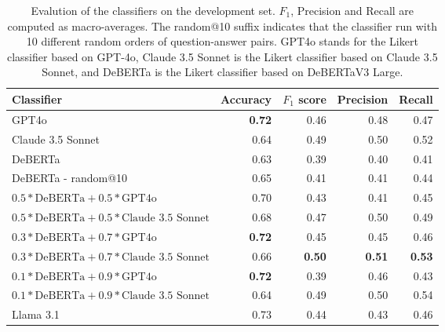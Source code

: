 \begin{table*}
    \centering
    \begin{tabular}{lrrrr}
        \toprule
        Classifier & Accuracy & $F_1$ score & Precision & Recall \\
        \midrule
        GPT4o & \textbf{0.72} & 0.46 & 0.48 & 0.47 \\
        Claude 3.5 Sonnet & 0.64 & 0.49 & 0.50 & 0.52 \\
        DeBERTa & 0.63 & 0.39 & 0.40 & 0.41 \\
        DeBERTa - random@10 & 0.65 & 0.41 & 0.41 & 0.44 \\
        $0.5*\mbox{DeBERTa}+0.5*\mbox{GPT4o}$ & 0.70 & 0.43 & 0.41 & 0.45 \\
        $0.5*\mbox{DeBERTa}+0.5*\mbox{Claude 3.5 Sonnet}$ & 0.68 & 0.47 & 0.50 & 0.49 \\
        $0.3*\mbox{DeBERTa}+0.7*\mbox{GPT4o}$ & \textbf{0.72} & 0.45 & 0.45 & 0.46 \\
        $0.3*\mbox{DeBERTa}+0.7*\mbox{Claude 3.5 Sonnet}$ & 0.66 & \textbf{0.50} & \textbf{0.51} & \textbf{0.53} \\
        $0.1*\mbox{DeBERTa}+0.9*\mbox{GPT4o}$ & \textbf{0.72} & 0.39 & 0.46 & 0.43 \\
        $0.1*\mbox{DeBERTa}+0.9*\mbox{Claude 3.5 Sonnet}$ & 0.64 & 0.49 & 0.50 & 0.54 \\
        \midrule
        Llama 3.1 & 0.73 & 0.44 & 0.43 & 0.46 \\
        \bottomrule
    \end{tabular} 

    \caption{Evalution of the classifiers on the development set. $F_1$, Precision and Recall are computed as macro-averages. The random@10 suffix indicates that the classifier run with 10 different random orders of question-answer pairs. GPT4o stands for the Likert classifier based on GPT-4o, Claude 3.5 Sonnet is the Likert classifier based on Claude 3.5 Sonnet, and DeBERTa is the Likert classifier based on DeBERTaV3 Large.}
\end{table*}
